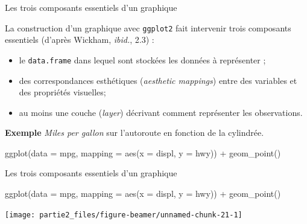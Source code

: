 \documentclass[12pt,ignorenonframetext,]{beamer}
\newenvironment{Shaded}{}{}
\newcommand{\DataTypeTok}[1]{#1}
\newcommand{\KeywordTok}[1]{\textcolor[rgb]{0.00,0.00,1.00}{#1}}
\newcommand{\NormalTok}[1]{#1}
\newcommand{\OperatorTok}[1]{#1}
\newcommand{\StringTok}[1]{\textcolor[rgb]{0.00,0.50,0.50}{#1}}
\providecommand{\tightlist}{%
  \setlength{\itemsep}{0pt}\setlength{\parskip}{0pt}}
\renewenvironment{Shaded}{\begin{snugshade}}{\end{snugshade}}
\newcommand{\intertitre}[1]{\textcolor{redInsee}{\textbf{#1}}}
\begin{document}
\begin{frame}[fragile]{\large Les trois composants essentiels d’un
graphique}
\protect\hypertarget{les-trois-composants-essentiels-dun-graphique}{}

La construction d’un graphique avec \texttt{ggplot2} fait intervenir
trois composants essentiels (d’après Wickham, \emph{ibid.}, 2.3) :

\begin{itemize}
\tightlist
\item
  le \texttt{data.frame} dans lequel sont stockées les données à
  représenter ;
\item
  des correspondances esthétiques (\emph{aesthetic mappings}) entre des
  variables et des propriétés visuelles;
\item
  au moins une couche (\emph{layer}) décrivant comment représenter les
  observations.
\end{itemize}

\pause

\intertitre{Exemple} \emph{Miles per gallon} sur l’autoroute en fonction
de la cylindrée.

\center \small

\begin{Shaded}
\begin{Highlighting}[]
\KeywordTok{ggplot}\NormalTok{(}\DataTypeTok{data =}\NormalTok{ mpg, }\DataTypeTok{mapping =} \KeywordTok{aes}\NormalTok{(}\DataTypeTok{x =}\NormalTok{ displ, }\DataTypeTok{y =}\NormalTok{ hwy)) }\OperatorTok{+}
\StringTok{  }\KeywordTok{geom_point}\NormalTok{()}
\end{Highlighting}
\end{Shaded}

\end{frame}

\begin{frame}[fragile]{\large Les trois composants essentiels d’un
graphique}
\protect\hypertarget{les-trois-composants-essentiels-dun-graphique-1}{}

\center \small

\begin{Shaded}
\begin{Highlighting}[]
\KeywordTok{ggplot}\NormalTok{(}\DataTypeTok{data =}\NormalTok{ mpg, }\DataTypeTok{mapping =} \KeywordTok{aes}\NormalTok{(}\DataTypeTok{x =}\NormalTok{ displ, }\DataTypeTok{y =}\NormalTok{ hwy)) }\OperatorTok{+}
\StringTok{  }\KeywordTok{geom_point}\NormalTok{()}
\end{Highlighting}
\end{Shaded}

\texttt{[image: partie2\_files/figure-beamer/unnamed-chunk-21-1]}

\end{frame}
\end{document}
